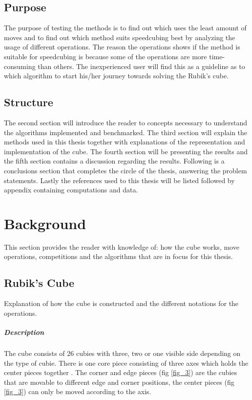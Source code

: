 \documentclass[a4paper,11pt]{kth-mag}
\begin{document}
\section{Purpose}
The purpose of testing the methods is to find out which uses the least amount of moves and to find out which method suits speedcubing best by analyzing the usage of different operations. The reason the operations shows if the method is suitable for speedcubing is because some of the operations are more time-consuming than others. The inexperienced user will find this as a guideline as to which algorithm to start his/her journey towards solving the Rubik’s cube.
\section{Structure}
The second section will introduce the reader to concepts necessary to understand the algorithms implemented and benchmarked. The third section will explain the methods used in this thesis together with explanations of the representation and implementation of the cube. The fourth section will be presenting the results and the fifth section contains a discussion regarding the results. Following is a conclusions section that completes the circle of the thesis, answering the problem statements. Lastly the references used to this thesis will be listed followed by appendix containing computations and data.  


\chapter{Background}
This section provides the reader with knowledge of: how the cube works, move operations, competitions and the algorithms that are in focus for this thesis.
\section{Rubik's Cube}
Explanation of how the cube is constructed and the different notations for the operations.
\paragraph{Description}
The cube consists of 26 cubies with three, two or one visible side depending on the type of cubie. There is one core piece consisting of three axes which holds the center pieces together \cite{MadeHow}. 
  The corner and edge pieces (fig \ref{fig_3})  are the cubies that are movable to different edge and corner positions, the center pieces (fig \ref{fig_3}) can only be moved according to the axis.  
\end{document}
